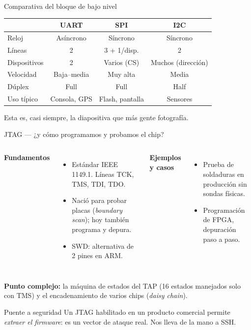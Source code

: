 \documentclass[aspectratio=169,11pt]{beamer}
\newcommand{\complejo}[1]{{\color{cobre}\textbf{Punto complejo:}} #1}
\begin{document}
\begin{frame}{Comparativa del bloque de bajo nivel}
\begin{center}
\begin{tabular}{@{}lccc@{}}
\toprule
 & \textbf{UART} & \textbf{SPI} & \textbf{I2C} \\
\midrule
Reloj        & Asíncrono & Síncrono & Síncrono \\
Líneas       & 2 & 3 + 1/disp. & 2 \\
Dispositivos & 2 & Varios (CS) & Muchos (dirección) \\
Velocidad    & Baja--media & Muy alta & Media \\
Dúplex       & Full & Full & Half \\
Uso típico   & Consola, GPS & Flash, pantalla & Sensores \\
\bottomrule
\end{tabular}
\end{center}
\vspace{0.5em}
{\footnotesize Esta es, casi siempre, la diapositiva que más gente fotografía.}
\end{frame}

\begin{frame}{JTAG — ¿y cómo programamos y probamos el chip?}
\begin{columns}[T]
\textbf{Fundamentos}
\begin{itemize}\small
  \item Estándar IEEE 1149.1. Líneas TCK, TMS, TDI, TDO.
  \item Nació para probar placas (\emph{boundary scan}); hoy también programa y depura.
  \item SWD: alternativa de 2 pines en ARM.
\end{itemize}
\textbf{Ejemplos y casos}
\begin{itemize}\small
  \item Prueba de soldaduras en producción sin sondas físicas.
  \item Programación de FPGA, depuración paso a paso.
\end{itemize}
\end{columns}
\vspace{0.4em}
\complejo{la \alert{máquina de estados del TAP} (16 estados manejados solo con TMS) y el encadenamiento de varios chips (\emph{daisy chain}).}
\vspace{0.3em}
\begin{alertblock}{Puente a seguridad}
Un JTAG habilitado en un producto comercial permite \emph{extraer el firmware}: es un vector de ataque real. Nos lleva de la mano a SSH.
\end{alertblock}
\end{frame}
\end{document}
